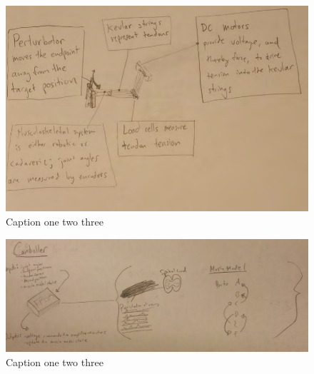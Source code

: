 \begin{figure}[hardware_schematic]
  \label{fig:hardware_schematic}
  \centering
  \includegraphics[width=1.0\textwidth]{figures/hardware_schematic.pdf}
  \caption{Caption one two three}
\end{figure}

\begin{figure}[fpga_schematic]
  \label{fig:fpga_schematic}
  \centering
  \includegraphics[width=1.0\textwidth]{figures/fpga_schematic.pdf}
  \caption{Caption one two three}
\end{figure}


